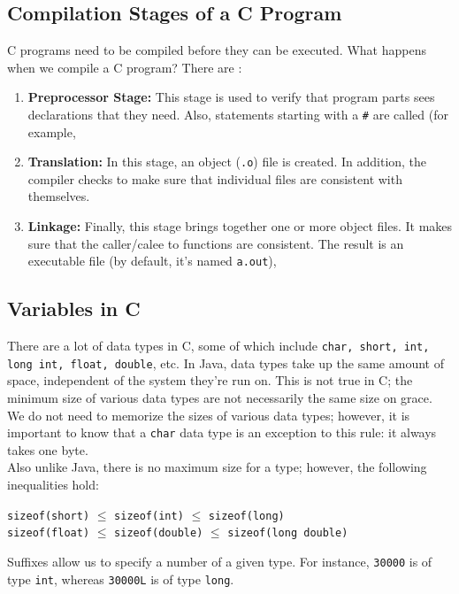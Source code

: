 
\subsection{Compilation Stages of a C Program}
C programs need to be compiled before they can be executed. What happens when we compile a C program? There are : \begin{enumerate}
    \item \textbf{Preprocessor Stage:} This stage is used to verify that program parts sees declarations that they need. Also, statements starting with a \verb!#! are called  (for example, 
    \item \textbf{Translation:} In this stage, an object (\verb!.o!) file is created. In addition, the compiler checks to make sure that individual files are consistent with themselves.
    \item \textbf{Linkage:} Finally, this stage brings together one or more object files. It makes sure that the caller/calee to functions are consistent. The result is an executable file (by default, it's named \verb!a.out!), 
\end{enumerate}


\subsection{Variables in C}
There are a lot of data types in C, some of which include \verb!char, short, int, long int, float, double!, etc. In Java, data types take up the same amount of space, independent of the system they're run on. This is not true in C; the minimum size of various data types are not necessarily the same size on grace. We do not need to memorize the sizes of various data types; however, it is important to know that a \verb!char! data type is an exception to this rule: it always takes one byte. \\

Also unlike Java, there is no maximum size for a type; however, the following inequalities hold:
\begin{center}
\verb!sizeof(short)! $\leq$ \verb!sizeof(int)! $\leq$ \verb!sizeof(long)! \\[0.7em]
\verb!sizeof(float)! $\leq$ \verb!sizeof(double)! $\leq$ \verb!sizeof(long double)!
\end{center}

Suffixes allow us to specify a number of a given type. For instance, \verb!30000! is of type \verb!int!, whereas \verb!30000L! is of type \verb!long!.



